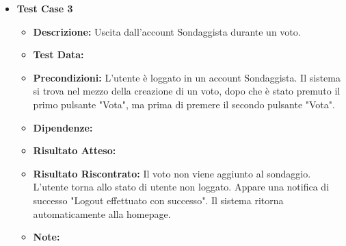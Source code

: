 \begin{itemize}
            \item \textbf{Test Case 3}
                \begin{itemize}
                    \item \textbf{Descrizione:} Uscita dall'account Sondaggista durante un voto.
                    \item \textbf{Test Data:}
                    \item \textbf{Precondizioni:} L'utente è loggato in un account Sondaggista. Il sistema si trova nel mezzo della creazione di un voto, dopo che è stato premuto il primo pulsante "Vota", ma prima di premere il secondo pulsante "Vota".
                    \item \textbf{Dipendenze:}
                    \item \textbf{Risultato Atteso:}
                    \item \textbf{Risultato Riscontrato:} Il voto non viene aggiunto al sondaggio. L'utente torna allo stato di utente non loggato. Appare una notifica di successo "Logout effettuato con successo". Il sistema ritorna automaticamente alla homepage.
                    \item \textbf{Note:}
                \end{itemize}                        
        \end{itemize}


